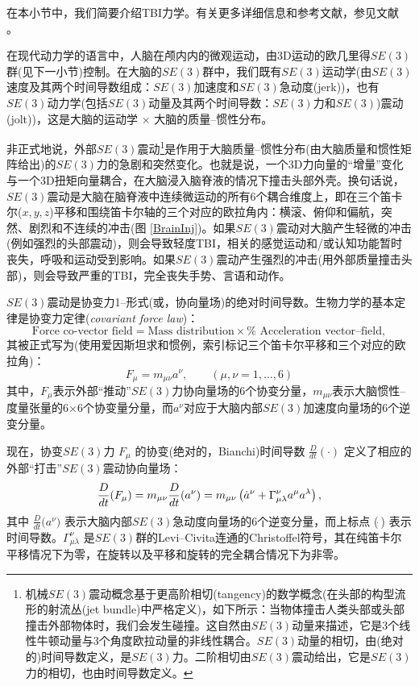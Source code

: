\documentclass[11pt,fontset=founder]{ctexart}
\begin{document}
在本小节中，我们简要介绍TBI力学。有关更多详细信息和参考文献，参见文献 \cite{ivbrain}。

在现代动力学的语言中，人脑在颅内内的微观运动，由3D运动的欧几里得$SE(3)$群(见下一小节)控制。在大脑的$SE(3)$群中，我们既有$SE(3)$运动学(由$SE(3)$速度及其两个时间导数组成：$SE(3)$加速度和$SE(3)$急动度(jerk))，也有$SE(3)$动力学(包括$SE(3)$动量及其两个时间导数：$SE(3)$力和$SE(3)$)震动(jolt))，这是大脑的运动学 $\times$ 大脑的质量–惯性分布。

非正式地说，外部$SE(3)$震动\footnote{机械$SE(3)$震动概念基于更高阶相切(tangency)的数学概念(在头部的构型流形的射流丛(jet bundle)中严格定义)，如下所示：当物体撞击人类头部或头部撞击外部物体时，我们会发生碰撞。这自然由$SE(3)$动量来描述，它是3个线性牛顿动量与3个角度欧拉动量的非线性耦合。$SE(3)$动量的相切，由(绝对的)时间导数定义，是$SE(3)$力。二阶相切由$SE(3)$震动给出，它是$SE(3)$力的相切，也由时间导数定义。}是作用于大脑质量–惯性分布(由大脑质量和惯性矩阵给出)的$SE(3)$力的急剧和突然变化。也就是说，一个3D力向量的“增量”变化与一个3D扭矩向量耦合，在大脑浸入脑脊液的情况下撞击头部外壳。换句话说，$SE(3)$震动是大脑在脑脊液中连续微运动的所有6个耦合维度上，即在三个笛卡尔($x,y,z$)平移和围绕笛卡尔轴的三个对应的欧拉角内：横滚、俯仰和偏航，突然、剧烈和不连续的冲击(图 \ref{BrainInj})。如果$SE(3)$震动对大脑产生轻微的冲击(例如强烈的头部震动)，则会导致轻度TBI，相关的感觉运动和/或认知功能暂时丧失，呼吸和运动受到影响。如果$SE(3)$震动产生强烈的冲击(用外部质量撞击头部)，则会导致严重的TBI，完全丧失手势、言语和动作。

$SE(3)$震动是协变力1–形式(或，协向量场)的绝对时间导数。生物力学的基本定律是协变力定律(\emph{covariant force law})：
$$\text{Force co-vector field}=\text{Mass distribution}\times \text{%
Acceleration vector--field},$$ 其被正式写为(使用爱因斯坦求和惯例，索引标记三个笛卡尔平移和三个对应的欧拉角)：
\begin{equation*}
F_{{\mu}}=m_{{\mu}{\nu}}a^{{\nu}},\qquad ({\mu,\nu}%
=1,...,6)
\end{equation*}
其中，$F_{{\mu}}$表示外部“推动”$SE(3)$力协向量场的6个协变分量，$m_{{\mu}{\nu}}$表示大脑惯性–度量张量的6$\times $6个协变量分量，而$a^{{\nu}}$对应于大脑内部$SE(3)$加速度向量场的6个逆变分量。

现在，协变$SE(3)$力 $F_{{\mu }}$ 的协变(绝对的，Bianchi)时间导数 $\frac{{D}}{dt}(\cdot )$ 定义了相应的外部“打击”$SE(3)$震动协向量场：
\begin{equation}
\frac{{D}}{dt}(F_{{\mu }})=m_{{\mu }{\nu }}\frac{{D}}{dt}(a^{{\nu }})=m_{{%
\mu }{\nu }}\left( \dot{a}^{{\nu }}+\Gamma _{\mu \lambda }^{{\nu }}a^{{\mu }%
}a^{{\lambda }}\right) ,  \label{Bianchi}
\end{equation}%
其中 ${\frac{{D}}{dt}}{(}a^{{\nu }})$ 表示大脑内部$SE(3)$急动度向量场的6个逆变分量，而上标点 ($\dot{~}$) 表示时间导数。$\Gamma _{\mu \lambda }^{{\nu }}$ 是$SE(3)$群的Levi–Civita连通的Christoffel符号，其在纯笛卡尔平移情况下为零，在旋转以及平移和旋转的完全耦合情况下为非零。
\end{document}
